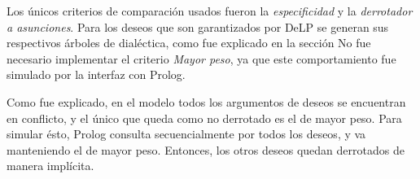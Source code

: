 \documentclass[oneside]{book}
\theoremstyle{definition}
\theoremstyle{example}
\begin{document}
Los únicos criterios de comparación usados fueron la \textit{especificidad} y la \textit{derrotador a 
asunciones}. Para los deseos que son garantizados por DeLP se generan sus respectivos árboles de dialéctica, como 
fue explicado en la sección %
No fue necesario implementar el criterio \textit{Mayor peso}, ya que este comportamiento
fue simulado por la interfaz con Prolog.

Como fue explicado, en el modelo todos los argumentos de deseos se encuentran en conflicto, y el 
único que queda como no derrotado es el de mayor peso. Para simular ésto, Prolog consulta 
secuencialmente por todos los deseos, y va manteniendo el de mayor peso. Entonces, los otros deseos
quedan derrotados de manera implícita.



%
%    
%    
%    
%    
%    
%    
%    
%    
%    
%
\end{document}
